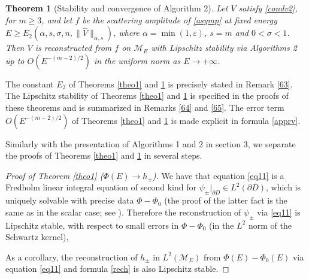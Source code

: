 \documentclass[11pt,a4paper,english,subeqn]{amsart}
\theoremstyle{plain}
\newtheorem{theo}[lem]{Theorem}
\theoremstyle{definition}
\numberwithin{equation}{section}
\begin{document}
\begin{theo}[Stability and convergence of Algorithm 2] \label{theo2}
Let $V$ satisfy \eqref{condv2}, for $m \geq 3$, and let $f$ be the scattering amplitude of \eqref{asymp} at fixed energy $E \geq E_2(\alpha,s,\sigma,n,\| \widehat V\|_{\alpha,s})$, where $\alpha = \min(1,\varepsilon)$, $s=m$ and $0 < \sigma < 1$. Then $V$ is reconstructed from $f$ on ${\mathscr{M}_E}$ with Lipschitz stability via Algorithms 2 up to $O(E^{-(m-2)/2})$ in the uniform norm as $E \to + \infty$.
\end{theo}

The constant $E_2$ of Theorems \ref{theo1} and \ref{theo2} is precisely stated in Remark \ref{63}.
The Lipschitz stability of Theorems \ref{theo1} and \ref{theo2} is specified in the proofs of these theorems and is summarized in Remarks \ref{64} and \ref{65}. The error term $O(E^{-(m-2)/2})$ of Theorems \ref{theo1} and \ref{theo2} is made explicit in formula \eqref{apprv}.\smallskip

Similarly with the presentation of Algorithms 1 and 2 in section 3, we separate the proofs of Theorems \ref{theo1} and \ref{theo2} in several steps.
\begin{proof}[Proof of Theorem \ref{theo1} ($\Phi(E) \longrightarrow h_{\pm}$)]
We have that equation \eqref{eq11} is a Fredholm linear integral equation of second kind for $\psi_{\pm}|_{\partial D} \in L^2(\partial D)$, which is uniquely solvable with precise data $\Phi - \Phi_0$ (the proof of the latter fact is the same as in the scalar case; see \cite{N1}). Therefore the reconstruction of $\psi_{\pm}$ via \eqref{eq11} is Lipschitz stable, with respect to small errors in $\Phi - \Phi_0$ (in the $L^2$ norm of the Schwartz kernel), 

As a corollary, the reconstruction of $h_{\pm}$ in $L^2({\mathscr{M}_E})$ from $\Phi(E)-\Phi_0(E)$ via equation \eqref{eq11} and formula \eqref{rech} is also Lipschitz stable.
\end{proof}
\end{document}
